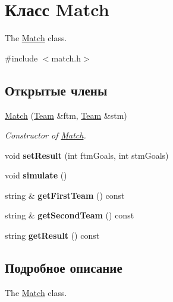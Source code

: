 \hypertarget{classMatch}{}\section{Класс Match}
\label{classMatch}


The \hyperlink{classMatch}{Match} class.  




{\ttfamily \#include $<$match.\+h$>$}

\subsection*{Открытые члены}
\begin{DoxyCompactItemize}
\item 
\hyperlink{classMatch_aa8d86b0a820f3bd970b69b9737bc6d06}{Match} (\hyperlink{classTeam}{Team} \&ftm, \hyperlink{classTeam}{Team} \&stm)
\begin{DoxyCompactList}\small\item\em Constructor of \hyperlink{classMatch}{Match}. \end{DoxyCompactList}\item 
\hypertarget{classMatch_acfd37660a8d4a96e3f2717b985cf793e}{}void {\bfseries set\+Result} (int ftm\+Goals, int stm\+Goals)\label{classMatch_acfd37660a8d4a96e3f2717b985cf793e}

\item 
\hypertarget{classMatch_a05f16c7efeba7e75158e92d853bb5482}{}void {\bfseries simulate} ()\label{classMatch_a05f16c7efeba7e75158e92d853bb5482}

\item 
\hypertarget{classMatch_ae5905d1ae95f6c27e1c8a2bcbc2a0af6}{}string \& {\bfseries get\+First\+Team} () const \label{classMatch_ae5905d1ae95f6c27e1c8a2bcbc2a0af6}

\item 
\hypertarget{classMatch_a0d4766ec5c297391af95e42f6b219f59}{}string \& {\bfseries get\+Second\+Team} () const \label{classMatch_a0d4766ec5c297391af95e42f6b219f59}

\item 
\hypertarget{classMatch_a0ebfba6c4ba9ab8e5115aa319bb5caf7}{}string {\bfseries get\+Result} () const \label{classMatch_a0ebfba6c4ba9ab8e5115aa319bb5caf7}

\end{DoxyCompactItemize}


\subsection{Подробное описание}
The \hyperlink{classMatch}{Match} class. 

